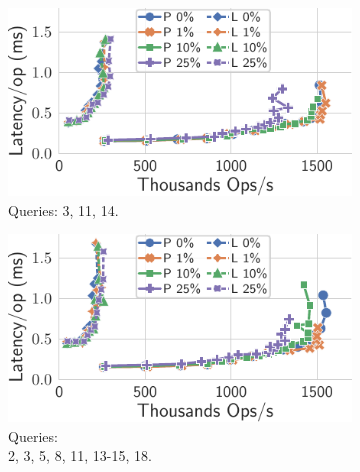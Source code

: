 \documentclass[sigplan,twocolumn,review,anonymous]{acmart}
\begin{document}
\begin{figure}
	\centering
	\begin{minipage}{.58\linewidth}
		\centering
	\begin{subfigure}{.32\linewidth}
		\includegraphics[width=1\linewidth]{queryScale/3Ops}
		\caption{Queries: 3, 11, 14.\\\hspace{\textwidth}}
		\label{fig:3Q}
	\end{subfigure}%
	\hspace*{0.3em}
	\begin{subfigure}{.32\linewidth}
		\includegraphics[width=1\linewidth]{queryScale/9Ops}
		\caption{Queries:\\\hspace{\textwidth} 2, 3, 5, 8, 11, 13-15, 18.}
		\label{fig:9Q}
	\end{subfigure}%
	\hspace*{0.3em}
	\begin{subfigure}{.32\linewidth}

\end{subfigure}
\end{minipage}
\end{figure}
\end{document}
